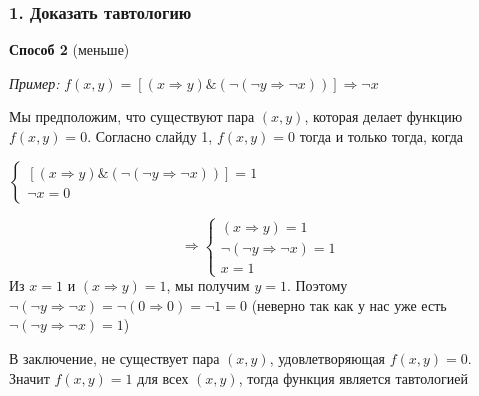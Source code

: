 \documentclass{beamer}
\begin{document}
\begin{frame}
	\frametitle{1. Доказать тавтологию}
	\textbf{Способ 2} (меньше)
	
	\textit{Пример:} $f(x, y) = [(x \Rightarrow y) \& (\lnot(\lnot y \Rightarrow \lnot x))] \Rightarrow \lnot x$
	
	Мы предположим, что существуют пара $(x, y)$, которая делает функцию $f(x, y) = 0$. Согласно слайду 1, $f(x, y) = 0$ тогда и только тогда, когда 
	\begin{multicols}{2}
		$\begin{cases}
			[(x \Rightarrow y) \& (\lnot(\lnot y \Rightarrow \lnot x))] = 1\\ \lnot x = 0
		\end{cases}
		$
		
		$$\Rightarrow
		\begin{cases}
			(x \Rightarrow y) = 1 \\
			\lnot(\lnot y \Rightarrow \lnot x) = 1 \\
			x = 1
		\end{cases}
		$$
		Из $x = 1$ и $(x \Rightarrow y) = 1$, мы получим $y=1$. Поэтому \vfill\null\columnbreak $\lnot(\lnot y \Rightarrow \lnot x) = \lnot(0 \Rightarrow 0) = \lnot 1 = 0$  (неверно так как у нас уже есть $\lnot(\lnot y \Rightarrow \lnot x) = 1$)
		
		В заключение, не существует пара $(x,y)$, удовлетворяющая $f(x, y) = 0$. Значит $f(x,y)=1$ для всех $(x,y)$, тогда функция является тавтологией
	\end{multicols}
\end{frame}
\end{document}
